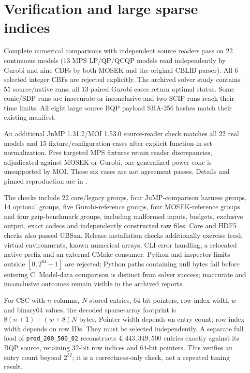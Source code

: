 \documentclass[10pt]{article}
\begin{document}
\section{Verification and large sparse indices}
Complete numerical comparisons with independent source readers pass on 22 continuous models (13 MPS LP/QP/QCQP models read independently by Gurobi and nine CBFs by both MOSEK and the original CBLIB parser). All 6 selected integer CBFs are rejected explicitly. The archived solver study contains 55 source/native runs; all 13 paired Gurobi cases return optimal status. Some conic/SDP runs are inaccurate or inconclusive and two SCIP runs reach their time limits. All eight large source BQP payload SHA-256 hashes match their existing manifest.

An additional JuMP 1.31.2/MOI 1.53.0 source-reader check matches all 22 real models and 15 fixture/configuration cases after explicit function-in-set normalization. Five targeted MPS fixtures retain reader discrepancies, adjudicated against MOSEK or Gurobi; one generalized power cone is unsupported by MOI. These six cases are not agreement passes. Details and pinned reproduction are in .

The checks include 22 core/legacy groups, four JuMP-comparison harness groups,
14 optional groups, five Gurobi-reference groups, four MOSEK-reference groups
and four gzip-benchmark groups,
including malformed inputs, budgets, exclusive output, exact codecs and
independently constructed raw files. Core and HDF5 checks also passed UBSan.
Release installation checks additionally exercise fresh virtual environments,
known numerical arrays, CLI error handling, a relocated native prefix and an
external CMake consumer. Python and inspector limits outside $[0,2^{64}-1]$ are
rejected; Python paths containing null bytes fail before entering C.
Model-data comparison is distinct from solver success;
inaccurate and inconclusive outcomes remain visible in the archived reports.

For CSC with $n$ columns, $N$ stored entries, 64-bit pointers, row-index width
$w$ and binary64 values, the decoded sparse-array footprint is
$8(n+1)+(w+8)N$ bytes. Pointer width depends on entry count; row-index width
depends on row IDs. They must be selected independently.
A separate full load of \texttt{prod\_200\_500\_02} reconstructs $4{,}443{,}349{,}500$ entries exactly against its BQP source, retaining 32-bit row indices and 64-bit pointers. This verifies an entry count beyond $2^{32}$; it is a correctness-only check, not a repeated timing result.
\end{document}
